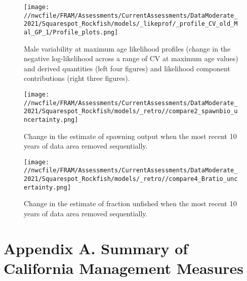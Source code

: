 \documentclass[11pt,
  english,
  a4paper,
]{article}
\begin{document}
\begin{figure}
\centering
\texttt{[image: //nwcfile/FRAM/Assessments/CurrentAssessments/DataModerate\_2021/Squarespot\_Rockfish/models/\_likeprof/\_profile\_CV\_old\_Mal\_GP\_1/Profile\_plots.png]}
\caption{Male variability at maximum age likelihood profiles (change in the negative log-likelihood across a range of CV at maximum age values) and derived quantities (left four figures) and likelihood component contributions (right three figures).\label{fig:CVold_m-profile-combo}}
\end{figure}

\tagmcend\tagstructend


\begin{figure}
\centering
\texttt{[image: //nwcfile/FRAM/Assessments/CurrentAssessments/DataModerate\_2021/Squarespot\_Rockfish/models/\_retro//compare2\_spawnbio\_uncertainty.png]}
\caption{Change in the estimate of spawning output when the most recent 10 years of data area removed sequentially.\label{fig:retro-ssb}}
\end{figure}

\tagmcend\tagstructend


\begin{figure}
\centering
\texttt{[image: //nwcfile/FRAM/Assessments/CurrentAssessments/DataModerate\_2021/Squarespot\_Rockfish/models/\_retro//compare4\_Bratio\_uncertainty.png]}
\caption{Change in the estimate of fraction unfished when the most recent 10 years of data area removed sequentially.\label{fig:retro-depl}}
\end{figure}

\tagmcend\tagstructend

\newpage

\clearpage


\hypertarget{appendix-a.-summary-of-california-management-measures}{%
\section{Appendix A. Summary of California Management Measures}\label{appendix-a.-summary-of-california-management-measures}}
\end{document}
